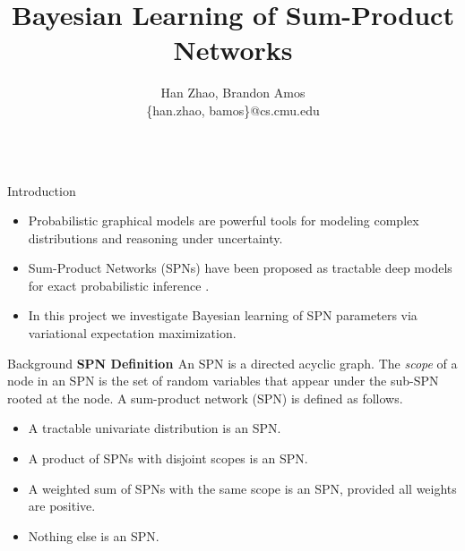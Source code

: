 \documentclass[final]{beamer}
\title{Bayesian Learning of Sum-Product Networks}
\author{Han Zhao, Brandon Amos \\
  \{han.zhao, bamos\}@cs.cmu.edu}
\institute{10-725 F15 COPTS}
\newlength{\onecolwid}
\newcommand{\cmuRed}[1]{\textcolor{CMURed}{#1}}
\newcommand{\cmuRedB}[1]{\textcolor{CMURed}{\textbf{#1}}}
\begin{document}

\setlength{\belowcaptionskip}{2ex} %
\setlength\belowdisplayshortskip{2ex} %

\begin{frame}[t]

  \begin{columns}[t]

    \hspace{-12cm}

    \begin{column}{\onecolwid} %
      \begin{block}{Introduction}
        \begin{itemize}
        \item \cmuRed{Probabilistic graphical models} are powerful tools for modeling
          complex distributions and reasoning under uncertainty.
        \item \cmuRed{Sum-Product Networks (SPNs)} have been
          proposed as tractable deep models for exact probabilistic inference
          \cite{poon2011sum}.
        \item In this project we investigate \cmuRed{Bayesian learning of SPN parameters} via
          variational expectation maximization.
        \end{itemize}
      \end{block}

      \begin{block}{Background}
        \cmuRedB{SPN Definition \cite{gens2013learning}}
        An SPN is a directed acyclic graph. The \emph{scope} of a node in an
        SPN is the set of random variables that appear under the sub-SPN
        rooted at the node. A sum-product network (SPN) is defined as follows.
        \begin{itemize}
        \item 	A \cmuRed{tractable univariate distribution} is an SPN.
        \item 	A \cmuRed{product} of SPNs with disjoint scopes is an SPN.
        \item 	A \cmuRed{weighted sum} of SPNs with the same scope is an SPN, provided all weights are positive.
        \item 	Nothing else is an SPN.
        \end{itemize}


\end{block}
\end{column}
\end{columns}
\end{frame}
\end{document}
